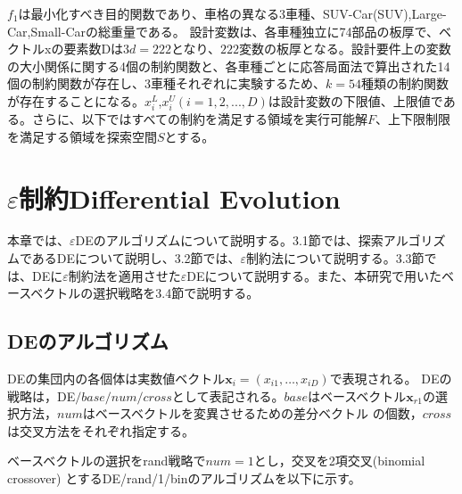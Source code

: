 \documentclass[a4paper,12pt]{jsreport}
\begin{document}
${f}_1$は最小化すべき目的関数であり、車格の異なる3車種、SUV-Car(SUV),Large-Car,Small-Carの総重量である。
設計変数は、各車種独立に74部品の板厚で、ベクトルxの要素数Dは$3d=222$となり、$222$変数の板厚となる。設計要件上の変数の大小関係に関する4個の制約関数と、各車種ごとに応答局面法で算出された14個の制約関数が存在し、3車種それぞれに実験するため、$k=54$種類の制約関数が存在することになる。${x}^L_i$,${x}^U_i(i=1,2,...,D)$は設計変数の下限値、上限値である。さらに、以下ではすべての制約を満足する領域を実行可能解$F$、上下限制限を満足する領域を探索空間$S$とする。



\chapter{$\varepsilon$制約Differential Evolution}
本章では、$\varepsilon$DEのアルゴリズム\cite{先行研究}について説明する。3.1節では、探索アルゴリズムであるDEについて説明し、3.2節では、$\varepsilon$制約法について説明する。3.3節では、DEに$\varepsilon$制約法を適用させた$\varepsilon$DEについて説明する。また、本研究で用いたベースベクトルの選択戦略を3.4節で説明する。

\section{DEのアルゴリズム}
DEの集団内の各個体は実数値ベクトル$\bm{x}_i=(x_{i1}, \dots, x_{iD})$で表現される。
DEの戦略は，DE$/base/num/cross$として表記される。$base$はベースベクトル$\bm{x}_{r1}$の選択方法，$num$はベースベクトルを変異させるための差分ベクトル
の個数，$cross$ は交叉方法をそれぞれ指定する。

ベースベクトルの選択をrand戦略で$num=1$とし，交叉を2項交叉(binomial crossover) とするDE/rand/1/binのアルゴリズムを以下に示す。
\end{document}
